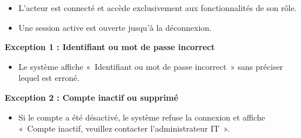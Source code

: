 \documentclass[11pt]{article}
\begin{document}
\begin{description}[leftmargin=4.2cm, style=nextline]
    \item[Postconditions]
    \begin{itemize}[leftmargin=*, nosep]
        \item L'acteur est connecté et accède exclusivement aux fonctionnalités
              de son rôle.
        \item Une session active est ouverte jusqu'à la déconnexion.
    \end{itemize}

    \item[Exceptions]
    \textbf{Exception 1 : Identifiant ou mot de passe incorrect}
    \begin{itemize}[leftmargin=*, nosep]
        \item Le système affiche «~Identifiant ou mot de passe incorrect~»
              sans préciser lequel est erroné.
    \end{itemize}
    \textbf{Exception 2 : Compte inactif ou supprimé}
    \begin{itemize}[leftmargin=*, nosep]
        \item Si le compte a été désactivé, le système refuse la connexion
              et affiche «~Compte inactif, veuillez contacter l'administrateur IT~».
    \end{itemize}
\end{description}
\end{document}
